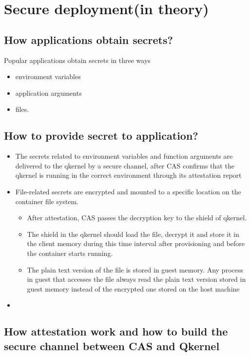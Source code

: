 \section{Secure deployment(in theory)}

\subsection{How applications obtain secrets?}

Popular applications obtain secrets in three ways
\begin{itemize}
    \item  environment variables
    \item  application arguments
    \item  files.
\end{itemize}

\subsection{How to provide secret to application?}

\begin{itemize}
    \item  The secrets related to environment variables and function arguments are  delivered to the qkernel by a secure channel, after CAS confirms that the qkernel is running in the correct environment through its attestation report
    \item  File-related secrets are encrypted and mounted to a specific location on the container file system.
    \begin{itemize}
        \item After attestation, CAS passes the decryption key to the shield of qkernel.
        \item The shield in the qkernel should load the file, decrypt it and store it in the client memory during this time interval after provisioning and before the container starts running.
        \item The plain text version of the file is stored in guest memory. Any process in guest that accesses the file always read the plain text version stored in guest memory instead of the encrypted one stored on the host machine
      \end{itemize}
    \item
\end{itemize}

\subsection{How attestation work and how to build the secure channel between CAS and Qkernel}


